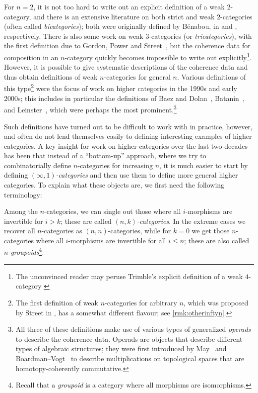 \documentclass[a4paper,11pt]{article}
\begin{document}
For $n = 2$, it is not too hard to write out an explicit definition of
a weak $2$-category, and there is an extensive literature on both strict
and weak $2$-categories (often called \emph{bicategories}); both were
originally defined by B\'enabou, in \cite{Ben65} and \cite{Ben67},
respectively. There is also some work on weak $3$-categories (or
\emph{tricategories}), with the first definition due to Gordon, Power
and Street~\cite{GordonPowerStreet}, but the coherence data for
composition in an $n$-category quickly becomes impossible to write out
explicitly\footnote{The unconvinced reader may peruse Trimble's
  explicit definition of a weak $4$-category \cite{Trimble}}. However,
it is possible to give systematic descriptions of the coherence data
and thus obtain definitions of weak $n$-categories for general $n$.
Various definitions of this type\footnote{The first definition of weak
  $n$-categories for arbitrary $n$, which was proposed by Street in
  \cite{StreetOriented}, has a somewhat different flavour; see
  \cref{rmk:otherinftyn}.}  were the focus of work on higher
categories in the 1990s and early 2000s; this includes in particular the definitions
of Baez and Dolan~\cite{BDopetope}, Batanin~\cite{Batanin}, and Leinster~\cite{LeinsterOpds}, which were perhaps the most
prominent.\footnote{All three of these definitions make use of various
  types of generalized \emph{operads} to describe the coherence
  data. Operads are objects that describe different
  types of algebraic structures; they were first introduced by
  May~\cite{May} and Boardman--Vogt~\cite{BoardmanVogt} to describe
  multiplications on topological spaces that are homotopy-coherently
  commutative.}


Such definitions have turned out to be difficult to work with in
practice, however, and often do not lend themselves easily to defining
interesting examples of higher categories. A key insight for work on
higher categories over the last two decades has been that instead of a
``bottom-up'' approach, where we try to combinatorially define
$n$-categories for increasing $n$, it is much easier to start by
defining \emph{$(\infty,1)$-categories} and then use them to define
more general higher categories. To explain what these objects are, we
first need the following terminology:

\begin{defn}
  Among the $n$-categories, we can single out those where all
  $i$-morphisms are invertible for $i > k$; these are called
  \emph{$(n,k)$-categories}. In the extreme cases we recover all
  $n$-categories as $(n,n)$-categories, while for $k = 0$ we get those
  $n$-categories where all $i$-morphisms are invertible for all
  $i \leq n$; these are also called
  \emph{$n$-groupoids}\footnote{Recall that a \emph{groupoid} is a
    category where all morphisms are isomorphisms.}.
\end{defn}
\end{document}
